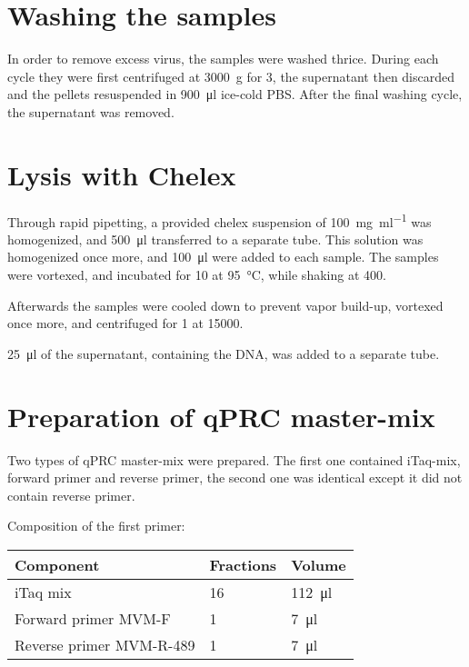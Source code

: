 \documentclass[a4paper,german]{scrreprt}
\begin{document}
\section{Washing the samples}

In order to remove excess virus, the samples were washed thrice. During each
cycle they were first centrifuged at \SI{3000}{g} for \SI{3}{\min}, the
supernatant then discarded and the pellets resuspended in \SI{900}{\ul} ice-cold
PBS. After the final washing cycle, the supernatant was removed.

\section{Lysis with Chelex}

Through rapid pipetting, a provided chelex suspension of \SI{100}{\mg \per \ml}
was homogenized, and \SI{500}{\ul} transferred to a separate tube. This
solution was homogenized once more, and \SI{100}{\ul} were added to each
sample. The samples were vortexed, and incubated for \SI{10}{\min} at
\SI{95}{\celsius}, while shaking at \SI{400}{\rpm}.

Afterwards the samples were cooled down to prevent vapor build-up, vortexed
once more, and centrifuged for \SI{1}{\min} at \SI{15000}{\rpm}.

\SI{25}{\ul} of the supernatant, containing the DNA, was added to a separate
tube.

\section{Preparation of qPRC master-mix}

Two types of qPRC master-mix were prepared. The first one contained iTaq-mix,
forward primer and reverse primer, the second one was identical except it did
not contain reverse primer.

Composition of the first primer:
\\

\begin{tabu}{lll}
	\toprule
	Component & Fractions & Volume \\
	\midrule
	iTaq mix & 16 & \SI{112}{\ul} \\
	Forward primer MVM-F & 1 & \SI{7}{\ul} \\
	Reverse primer MVM-R-489 & 1 & \SI{7}{\ul} \\
	\bottomrule
\end{tabu}
\\
\end{document}
